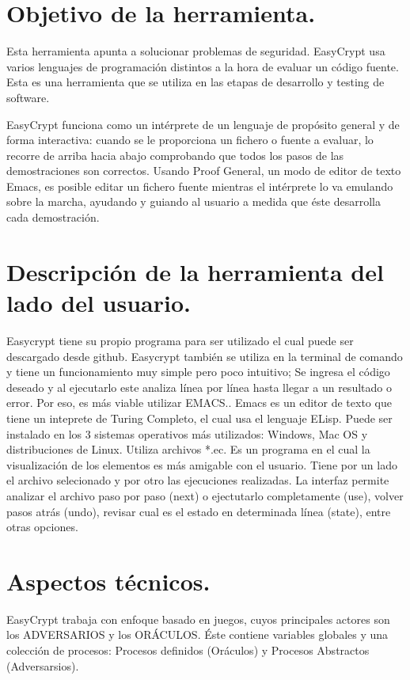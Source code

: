 \documentclass[runningheads,a4paper]{llncs}
\begin{document}
\section{Objetivo de la herramienta.} 

Esta herramienta apunta a solucionar problemas de seguridad. EasyCrypt usa varios lenguajes de programación distintos a la hora de evaluar un código fuente. Esta es una herramienta que se utiliza en las etapas de desarrollo y testing de software. 

EasyCrypt funciona como un intérprete de un lenguaje de propósito general y de forma interactiva: cuando se le proporciona un fichero o fuente a evaluar, lo recorre de arriba hacia abajo comprobando que todos los pasos de las demostraciones son correctos. Usando Proof General, un modo de editor de texto Emacs, es posible editar un fichero fuente mientras el intérprete lo va emulando sobre la marcha, ayudando y guiando al usuario a medida que éste desarrolla cada demostración. 

\section{Descripción de la herramienta del lado del usuario.}

Easycrypt tiene su propio programa para ser utilizado el cual puede ser descargado desde github.\cite{link1}
Easycrypt también se utiliza en la terminal de comando y tiene un funcionamiento muy simple pero poco intuitivo; Se ingresa el código deseado y al ejecutarlo este analiza línea por línea hasta llegar a un resultado o error. Por eso, es más viable utilizar EMACS.\cite{link2}. Emacs es un editor de texto que tiene un inteprete de Turing Completo, el cual usa el lenguaje ELisp. Puede ser instalado en los 3 sistemas operativos más utilizados: Windows, Mac OS y distribuciones de Linux. Utiliza archivos *.ec. Es un programa en el cual la visualización de los elementos es más amigable con el usuario. Tiene por un lado el archivo selecionado y por otro las ejecuciones realizadas. La interfaz permite analizar el archivo paso por paso (next) o ejectutarlo completamente (use), volver pasos atrás (undo), revisar cual es el estado en determinada línea (state), entre otras opciones.


\section{Aspectos técnicos.}
EasyCrypt trabaja con enfoque basado en juegos, cuyos principales actores son los ADVERSARIOS y los ORÁCULOS. Éste contiene variables globales y una colección de procesos: Procesos definidos (Oráculos) y Procesos Abstractos (Adversarsios).
\end{document}
